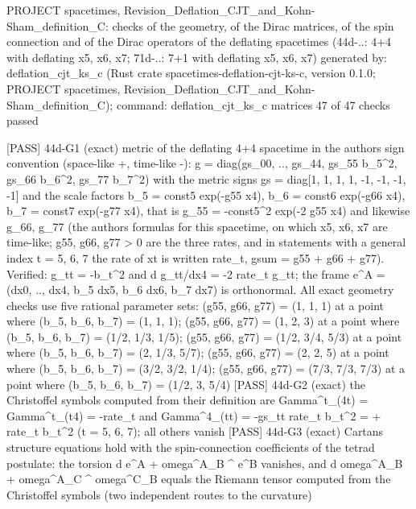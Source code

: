 \documentclass[
  10pt,
]{article}
\newenvironment{Shaded}{}{}
\newcommand{\NormalTok}[1]{#1}
\begin{document}
\begin{Shaded}
\begin{Highlighting}[]
\NormalTok{PROJECT spacetimes, Revision\_Deflation\_CJT\_and\_Kohn{-}Sham\_definition\_C: checks of the geometry, of the Dirac matrices, of the spin connection and of the Dirac operators of the deflating spacetimes (44d{-}..: 4+4 with deflating x5, x6, x7; 71d{-}..: 7+1 with deflating x5, x6, x7)}
\NormalTok{generated by: deflation\_cjt\_ks\_c (Rust crate spacetimes{-}deflation{-}cjt{-}ks{-}c, version 0.1.0; PROJECT spacetimes, Revision\_Deflation\_CJT\_and\_Kohn{-}Sham\_definition\_C); command: deflation\_cjt\_ks\_c matrices}
\NormalTok{47 of 47 checks passed}

\NormalTok{[PASS] 44d{-}G1  (exact) metric of the deflating 4+4 spacetime in the author\textquotesingle{}s sign convention (space{-}like +, time{-}like {-}): g = diag(gs\_00, .., gs\_44, gs\_55 b\_5\^{}2, gs\_66 b\_6\^{}2, gs\_77 b\_7\^{}2) with the metric signs gs = diag[1, 1, 1, 1, {-}1, {-}1, {-}1, {-}1] and the scale factors b\_5 = const5 exp({-}g55 x4), b\_6 = const6 exp({-}g66 x4), b\_7 = const7 exp({-}g77 x4), that is g\_55 = {-}const5\^{}2 exp({-}2 g55 x4) and likewise g\_66, g\_77 (the author\textquotesingle{}s formulas for this spacetime, on which x5, x6, x7 are time{-}like; g55, g66, g77 \textgreater{} 0 are the three rates, and in statements with a general index t = 5, 6, 7 the rate of xt is written rate\_t, gsum = g55 + g66 + g77). Verified: g\_tt = {-}b\_t\^{}2 and d g\_tt/dx4 = {-}2 rate\_t g\_tt; the frame e\^{}A = (dx0, .., dx4, b\_5 dx5, b\_6 dx6, b\_7 dx7) is orthonormal. All exact geometry checks use five rational parameter sets: (g55, g66, g77) = (1, 1, 1) at a point where (b\_5, b\_6, b\_7) = (1, 1, 1); (g55, g66, g77) = (1, 2, 3) at a point where (b\_5, b\_6, b\_7) = (1/2, 1/3, 1/5); (g55, g66, g77) = (1/2, 3/4, 5/3) at a point where (b\_5, b\_6, b\_7) = (2, 1/3, 5/7); (g55, g66, g77) = (2, 2, 5) at a point where (b\_5, b\_6, b\_7) = (3/2, 3/2, 1/4); (g55, g66, g77) = (7/3, 7/3, 7/3) at a point where (b\_5, b\_6, b\_7) = (1/2, 3, 5/4)}
\NormalTok{[PASS] 44d{-}G2  (exact) the Christoffel symbols computed from their definition are Gamma\^{}t\_(4t) = Gamma\^{}t\_(t4) = {-}rate\_t and Gamma\^{}4\_(tt) = {-}gs\_tt rate\_t b\_t\^{}2 = + rate\_t b\_t\^{}2 (t = 5, 6, 7); all others vanish}
\NormalTok{[PASS] 44d{-}G3  (exact) Cartan\textquotesingle{}s structure equations hold with the spin{-}connection coefficients of the tetrad postulate: the torsion d e\^{}A + omega\^{}A\_B \^{} e\^{}B vanishes, and d omega\^{}A\_B + omega\^{}A\_C \^{} omega\^{}C\_B equals the Riemann tensor computed from the Christoffel symbols (two independent routes to the curvature)}

\end{Highlighting}
\end{Shaded}
\end{document}
